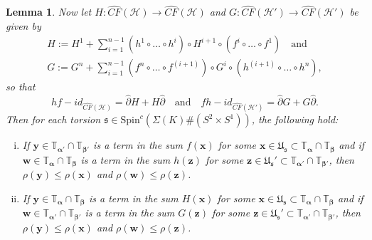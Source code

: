 \documentclass[11pt]{article}
\theoremstyle{plain} \newtheorem{thm}{Theorem}[subsection]
\theoremstyle{plain} \newtheorem{cor}[thm]{Corollary}
\theoremstyle{plain} \newtheorem{prop}[thm]{Proposition}
\theoremstyle{plain} \newtheorem{conj}[thm]{Conjecture}
\theoremstyle{plain} \newtheorem{lem}[thm]{Lemma}
\theoremstyle{definition} \newtheorem{df}[thm]{Definition}
\theoremstyle{remark} \newtheorem{rmk}[thm]{Remark}
\theoremstyle{remark} \newtheorem{obs}[thm]{Observation}
\newcommand{\DBCs}[1]{\Sigma(#1)\#(S^{2}\times S^{1})}
\newcommand{\h}{\mathcal{H}}
\newcommand{\del}{\partial}
\newcommand{\delh}{\widehat{\del}}
\newcommand{\Us}{\mathfrak{U}_{\mathfrak{s}}}
\newcommand{\Scx}[1]{\text{Spin}^{c}(\DBCs{#1})}
\newcommand{\ba}{\boldsymbol{\alpha}}
\newcommand{\bb}{\boldsymbol{\beta}}
\newcommand{\Ta}{\mathbb{T}_{\ba}}
\newcommand{\Tb}{\mathbb{T}_{\bb}}
\newcommand{\bx}{\mathbf{x}}
\newcommand{\by}{\mathbf{y}}
\newcommand{\bw}{\mathbf{w}}
\newcommand{\bz}{\mathbf{z}}
\newcommand{\tor}[1]{\mathbb{T}_{#1}}
\begin{document}
\begin{lem}
Now let $H: \widehat{CF}(\h) \rightarrow \widehat{CF}(\h)$ and $G: \widehat{CF}(\h') \rightarrow \widehat{CF}(\h')$ be given by
\begin{equation}\label{eqn:hom}
\begin{aligned}
H:= H^{1} + \sum_{i=1}^{n-1} \left( h^{1} \circ \ldots \circ h^{i}\right) \circ H^{i+1} \circ \left( f^{i} \circ \ldots \circ f^{1}\right) \quad \text{and}\\
G:= G^{n} + \sum_{i=1}^{n-1} \left( f^{n} \circ \ldots \circ f^{(i + 1)}\right) \circ G^{i} \circ \left( h^{(i + 1)} \circ \ldots \circ h^{n}\right),
\end{aligned}
\end{equation}
so that
\begin{equation*}
hf - id_{\widehat{CF}(\h)} = \delh H + H\delh \quad \text{and} \quad fh - id_{\widehat{CF}(\h')} = \delh G + G \delh.
\end{equation*}
Then for each torsion $\mathfrak{s} \in \Scx{K}$, the following hold:
\begin{enumerate}[(i)]
\item
If $\by \in \tor{\ba'} \cap \tor{\bb'}$ is a term in the sum $f(\bx)$ for some $\bx \in \Us \subset \Ta \cap \Tb $ and if $\bw\in \Ta \cap \Tb$ is a term in the sum $h(\bz)$ for some $\bz \in \Us' \subset \tor{\ba'} \cap \tor{\bb'} $, then $\rho(\by) \leq \rho(\bx)$ and $\rho(\bw) \leq \rho(\bz)$.
\item 
If $\by \in \Ta \cap \Tb$ is a term in the sum $H(\bx)$ for some $\bx \in \Us \subset \Ta \cap \Tb$ and if $\bw \in \tor{\ba'} \cap \tor{\bb'}$ is a term in the sum $G(\bz)$ for some $\bz \in \Us' \subset \tor{\ba'} \cap \tor{\bb'}$, then $\rho(\by) \leq \rho(\bx)$ and $\rho(\bw) \leq \rho(\bz)$.
\end{enumerate}
\end{lem}
\end{document}

